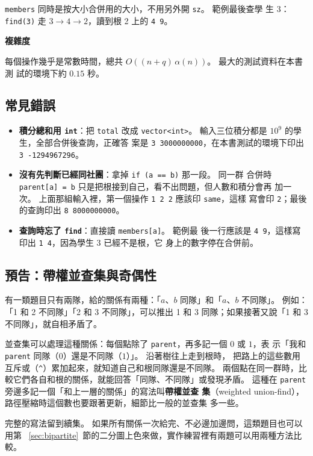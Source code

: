 \texttt{members} 同時是按大小合併用的大小，不用另外開 \texttt{sz}。 範例最後查學
生 3：\texttt{find(3)} 走 $3 \to 4 \to 2$，讀到根 2 上的 \texttt{4 9}。

\textbf{複雜度}

每個操作幾乎是常數時間，總共 $O((n + q)\,\alpha(n))$。 最大的測試資料在本書測
試的環境下約 $0.15$ 秒。

\subsection{常見錯誤}

\begin{itemize}
\item \textbf{積分總和用 \texttt{int}}：把 \texttt{total} 改成
\texttt{vector<int>}。 輸入三位積分都是 $10^9$ 的學生，全部合併後查詢，正確答
案是 \texttt{3 3000000000}，在本書測試的環境下印出 \texttt{3 -1294967296}。
\item \textbf{沒有先判斷已經同社團}：拿掉 \texttt{if (a == b)} 那一段。 同一群
合併時 \texttt{parent[a] = b} 只是把根接到自己，看不出問題，但人數和積分會再
加一次。 上面那組輸入裡，第一個操作 \texttt{1 2 2} 應該印 \texttt{same}，這樣
寫會印 \texttt{2}；最後的查詢印出 \texttt{8 8000000000}。
\item \textbf{查詢時忘了 \texttt{find}}：直接讀 \texttt{members[a]}。 範例最
後一行應該是 \texttt{4 9}，這樣寫印出 \texttt{1 4}，因為學生 3 已經不是根，它
身上的數字停在合併前。
\end{itemize}

\subsection{預告：帶權並查集與奇偶性}
\label{sec:dsu-parity}

有一類題目只有兩隊，給的關係有兩種：「$a$、$b$ 同隊」和「$a$、$b$ 不同隊」。 例如：「1 和 2 不同隊」「2 和 3 不同隊」，可以推出 1 和
3 同隊；如果接著又說「1 和 3 不同隊」，就自相矛盾了。

並查集可以處理這種關係：每個點除了 \texttt{parent}，再多記一個 $0$ 或 $1$，表
示「我和 \texttt{parent} 同隊（$0$）還是不同隊（$1$）」。 沿著樹往上走到根時，
把路上的這些數用互斥或（\texttt{\^}）累加起來，就知道自己和根同隊還是不同隊。
兩個點在同一群時，比較它們各自和根的關係，就能回答「同隊、不同隊」或發現矛盾。
這種在 \texttt{parent} 旁邊多記一個「和上一層的關係」的寫法叫\textbf{帶權並查
集}（weighted union-find），路徑壓縮時這個數也要跟著更新，細節比一般的並查集
多一些。

完整的寫法留到續集。 如果所有關係一次給完、不必邊加邊問，這類題目也可以用第
~\ref{sec:bipartite}~節的二分圖上色來做，實作練習裡有兩題可以用兩種方法比較。

